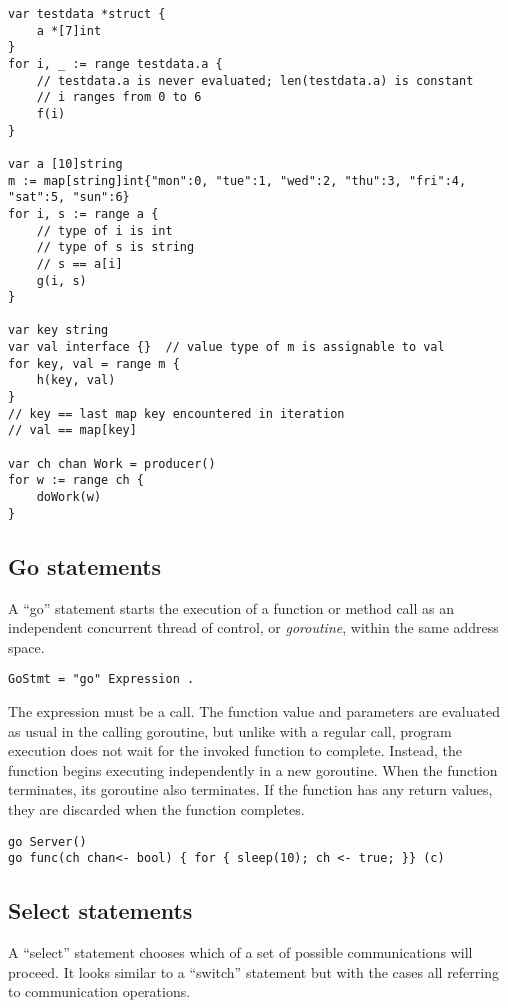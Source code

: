 \begin{Verbatim}[frame=single]
var testdata *struct {
    a *[7]int
}
for i, _ := range testdata.a {
    // testdata.a is never evaluated; len(testdata.a) is constant
    // i ranges from 0 to 6
    f(i)
}

var a [10]string
m := map[string]int{"mon":0, "tue":1, "wed":2, "thu":3, "fri":4, "sat":5, "sun":6}
for i, s := range a {
    // type of i is int
    // type of s is string
    // s == a[i]
    g(i, s)
}

var key string
var val interface {}  // value type of m is assignable to val
for key, val = range m {
    h(key, val)
}
// key == last map key encountered in iteration
// val == map[key]

var ch chan Work = producer()
for w := range ch {
    doWork(w)
}
\end{Verbatim}

\subsection*{Go statements}

A ``go'' statement starts the execution of a function or method call as
an independent concurrent thread of control, or \emph{goroutine}, within
the same address space.

\begin{Verbatim}[frame=single]
GoStmt = "go" Expression .
\end{Verbatim}

The expression must be a call. The function value and parameters are
evaluated as usual in the calling goroutine, but
unlike with a regular call, program execution does not wait for the
invoked function to complete. Instead, the function begins executing
independently in a new goroutine. When the function terminates, its
goroutine also terminates. If the function has any return values, they
are discarded when the function completes.

\begin{Verbatim}[frame=single]
go Server()
go func(ch chan<- bool) { for { sleep(10); ch <- true; }} (c)
\end{Verbatim}

\subsection*{Select statements}

A ``select'' statement chooses which of a set of possible communications
will proceed. It looks similar to a ``switch'' statement but with the
cases all referring to communication operations.

